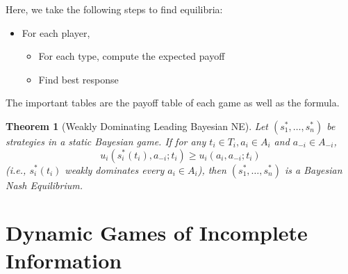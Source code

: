\documentclass[12pt]{article}
\newtheorem{theorem}{Theorem}[section]
\theoremstyle{definition}
\begin{document}
Here, we take the following steps to find equilibria:
\begin{itemize}
  \item For each player,
  \begin{itemize}
    \item For each type, compute the expected payoff
    \item Find best response
  \end{itemize}
\end{itemize}
The important tables are the payoff table of each game as well as the formula.
\begin{theorem}[Weakly Dominating Leading Bayesian NE]
\normalfont Let $(s_1^\ast, \ldots, s_n^\ast)$ be strategies in a static Bayesian game. If for any $t_i\in T_i, a_i\in A_i$ and $a_{-i}\in A_{-i}$,
\[
u_i(s_i^\ast(t_i), a_{-i}; t_i) \geq u_i(a_i, a_{-i}; t_i)
\]
(i.e., $s_i^\ast(t_i)$ weakly dominates every $a_i\in A_i$), then $(s_1^\ast, \ldots, s_n^\ast)$ is a Bayesian Nash Equilibrium.
\end{theorem}
\section{Dynamic Games of Incomplete Information}
\end{document}

